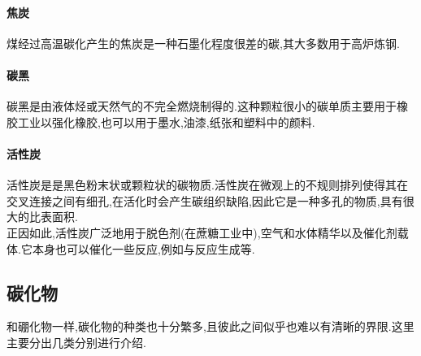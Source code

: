 \documentclass[draft]{ctexart}
\begin{document}
\paragraph{焦炭}
煤经过高温碳化产生的焦炭是一种石墨化程度很差的碳,其大多数用于高炉炼钢.
\paragraph{碳黑}
碳黑是由液体烃或天然气的不完全燃烧制得的.这种颗粒很小的碳单质主要用于橡胶工业以强化橡胶,也可以用于墨水,油漆,纸张和塑料中的颜料.
\paragraph{活性炭}
活性炭是是黑色粉末状或颗粒状的碳物质.活性炭在微观上的不规则排列使得其在交叉连接之间有细孔,在活化时会产生碳组织缺陷,因此它是一种多孔的物质,具有很大的比表面积.\\
\indent 正因如此,活性炭广泛地用于脱色剂(在蔗糖工业中),空气和水体精华以及催化剂载体.它本身也可以催化一些反应,例如与反应生成等.
\subsection{碳化物}
和硼化物一样,碳化物的种类也十分繁多,且彼此之间似乎也难以有清晰的界限.这里主要分出几类分别进行介绍.
\end{document}

